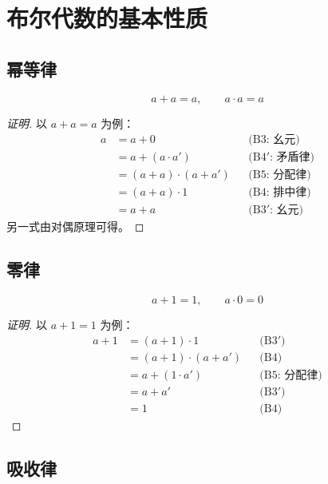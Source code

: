 \section{布尔代数的基本性质}

\subsection{幂等律}

\begin{myformula}
\[
a + a = a, \qquad a\cdot a = a
\]
\end{myformula}

\begin{proof}[证明]
以 \(a+a=a\) 为例：
\[
\begin{aligned}
a &= a + 0                     && \text{(B3: 幺元)} \\
  &= a + (a \cdot a')          && \text{(B4$'$: 矛盾律)} \\
  &= (a + a)\cdot(a + a')      && \text{(B5: 分配律)} \\
  &= (a + a)\cdot 1            && \text{(B4: 排中律)} \\
  &= a + a                     && \text{(B3$'$: 幺元)}
\end{aligned}
\]
另一式由对偶原理可得。
\end{proof}

\subsection{零律}

\begin{myformula}
\[
a + 1 = 1, \qquad a\cdot 0 = 0
\]
\end{myformula}

\begin{proof}[证明]
以 \(a+1=1\) 为例：
\[
\begin{aligned}
a + 1 &= (a+1) \cdot 1                       && \text{(B3$'$)} \\
      &= (a+1)\cdot(a+a')                    && \text{(B4)} \\
      &= a + (1\cdot a')                     && \text{(B5: 分配律)} \\
      &= a + a'                              && \text{(B3$'$)} \\
      &= 1                                   && \text{(B4)}
\end{aligned}
\]
\end{proof}

\subsection{吸收律}

